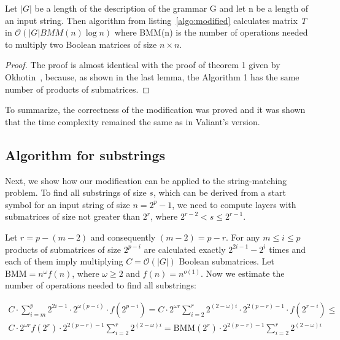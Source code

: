 \begin{theorem}
Let $|G|$ be a length of the description of the grammar G and let n be a length of an input string. Then algorithm from listing~\ref{algo:modified} calculates matrix \textit{T} in $\mathcal{O}(|G|BMM(n)\log{n})$ where BMM(n) is the number of operations needed to multiply two Boolean matrices of size $n \times n$.
\end{theorem}

\begin{proof}
The proof is almost identical with the proof of theorem 1 given by Okhotin~\cite{Okhotin:2014:PMM:2565359.2565379}, because, as shown in the last lemma, the Algorithm 1 has the same number of products of submatrices.
\end{proof}

To summarize, the correctness of the modification was proved and it was shown that the time complexity remained the same as in Valiant's version.


\subsection{Algorithm for substrings}

Next, we show how our modification can be applied to the string-matching problem.
To find all substrings of size $s$, which can be derived from a start symbol for an input string of size $n = 2^p - 1$, we need to compute layers with submatrices of size not greater than $2^{r}$, where $2^{r - 2} < s \le 2^{r - 1}$.

Let $r = p - (m - 2)$ and consequently $(m - 2) = p - r$.
For any  $m \le i \le p$ products of submatrices of size $2^{p - i}$ are calculated exactly $2^{2i - 1} - 2^{i}$ times and each of them imply multiplying $C = \mathcal{O}(|G|)$ Boolean submatrices. Let $\mathrm{BMM} = n^\omega f(n)$, where $\omega \geq 2$ and $f(n) = n^{o(1)}$.
Now we estimate the number of operations needed to find all substrings:

\begin{equation*}
\begin{array}{c}
C \cdot \sum\limits_{i=m}^p 2^{2i - 1} \cdot 2^{\omega(p - i)} \cdot f(2^{p - i}) =
C \cdot 2^{\omega r}\sum\limits_{i=2}^{r} 2^{(2 - \omega)i} \cdot 2^{2(p - r) - 1} \cdot f(2^{r - i}) \le \\
C \cdot 2^{\omega r} f(2^{r}) \cdot 2^{2(p - r) - 1} \sum\limits_{i=2}^{r} 2^{(2 - \omega)i} =
\mathrm{BMM}(2^{r}) \cdot 2^{2(p - r) - 1} \sum\limits_{i=2}^{r} 2^{(2 - \omega)i}
\end{array}
\end{equation*}

